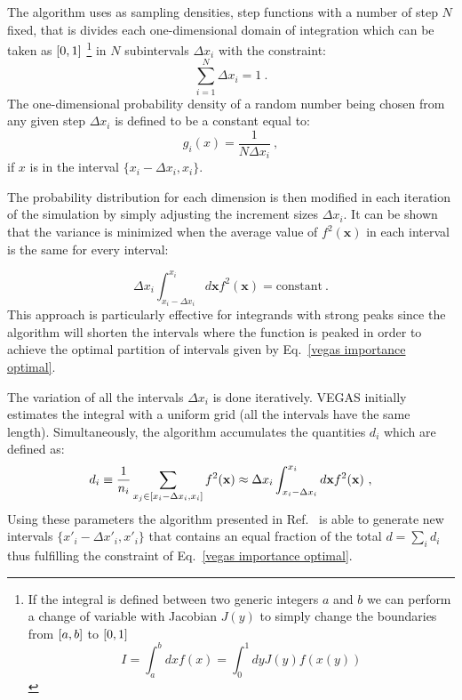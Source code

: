 \documentclass[../main/main.tex]{subfiles}
\begin{document}
The algorithm uses as sampling densities, step functions with a number of step $N$ fixed, that is divides each one-dimensional domain of integration which can be taken as $\interval{0}{1}$ \footnote{If the integral is defined between two generic integers $a$ and $b$ we can perform a change of variable with Jacobian $J(y)$ to simply change the boundaries from $\interval{a}{b}$ to $\interval{0}{1}$
\begin{equation}
	I = \int_a^b dx  f(x) = \int_0^1 dy J(y)f(x(y)) 
\end{equation}}
 in $N$ subintervals $\Delta x_i$ with the constraint:
\begin{equation}
	\sum_{i=1}^N \Delta x_i = 1 \ .
\end{equation}
The one-dimensional probability density of a random number being chosen from any given step $\Delta x_i$ is defined to be a constant equal to:
\begin{equation}
	g_i(x) = \frac{1}{N \Delta x_i} \ ,
\end{equation}
if $x$ is in the interval  $\{x_i - \Delta x_i, x_i \}$.

The probability distribution for each dimension is then modified in each iteration of the simulation by simply adjusting the increment sizes $\Delta x_i$.  It can be shown that the variance is minimized when the average value of $f^2(\textbf{x})$ in each interval is the same for every interval:

\begin{equation}
	\label{vegas importance optimal}
	\Delta x_i \int_{x_i - \Delta x_i}^{x_i} d\textbf{x} f^2(\textbf{x}) = \text{constant} \ .
\end{equation}
This approach is particularly effective for integrands with strong peaks since the algorithm will shorten the intervals where the function is peaked in order to achieve the optimal partition of intervals given by Eq.~\ref{vegas importance optimal}.

The variation of all the intervals $\Delta x_i$ is done iteratively. 
VEGAS initially estimates the integral with a uniform grid (all the intervals have the same length). Simultaneously, the algorithm  accumulates the quantities $d_i$ which are defined as:
\begin{equation}
	d_i \equiv \frac{1}{n_i} \sum_{x_j \in \interval{x_i - \Delta x_i}{x_i} } f^2(\textbf{x}) \approx \Delta x_i \int_{x_i - \Delta x_i}^{x_i} d\textbf{x} f^2(\textbf{x})  \ ,
\end{equation}
Using these parameters the algorithm presented in Ref.~\cite{Lepage:2020tgj} is able to generate new intervals $\{x'_i - \Delta x'_i, x'_i \}$ that contains an equal fraction of the total $d = \sum_i d_i$ thus fulfilling the constraint of Eq.~\ref{vegas importance optimal}.
\end{document}
